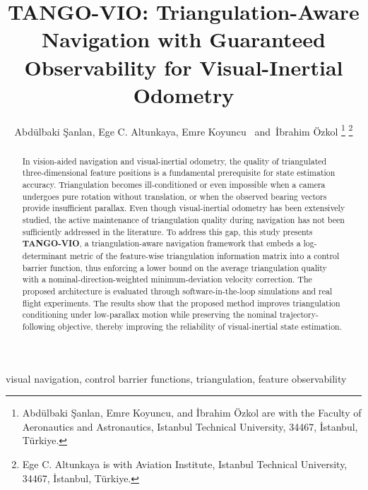 \documentclass[journal]{IEEEtran}
\begin{document}
\title{TANGO-VIO: Triangulation-Aware Navigation with Guaranteed Observability for Visual-Inertial Odometry}

\author{Abdülbaki Şanlan,
        Ege C. Altunkaya,
        Emre Koyuncu~ and~İbrahim Özkol 
\thanks{Abdülbaki Şanlan, Emre Koyuncu, and İbrahim Özkol are with the Faculty of Aeronautics and Astronautics, Istanbul Technical University, 34467, İstanbul, Türkiye.}
\thanks{Ege C. Altunkaya is with Aviation Institute, Istanbul Technical University, 34467, İstanbul, Türkiye.}}


\maketitle

\begin{abstract}
    In vision-aided navigation and visual-inertial odometry, the quality of
    triangulated three-dimensional feature positions is a fundamental prerequisite for state estimation accuracy. Triangulation becomes ill-conditioned or even impossible when a camera undergoes pure rotation without translation, or when the observed bearing vectors provide insufficient parallax. Even though visual-inertial odometry has been extensively studied, the active maintenance of triangulation quality during navigation has not been sufficiently addressed in the literature. To address this gap, this study presents \textbf{TANGO-VIO}, a triangulation-aware navigation framework that embeds a log-determinant metric of the feature-wise triangulation information matrix into a control barrier function, thus enforcing a lower bound on the average triangulation quality with a nominal-direction-weighted minimum-deviation velocity correction. The proposed architecture is evaluated through software-in-the-loop simulations and real flight experiments. The results show that the proposed method improves triangulation conditioning under low-parallax motion while preserving the nominal trajectory-following objective, thereby improving the reliability of visual-inertial state estimation.
\end{abstract}

\begin{IEEEkeywords}
    visual navigation, control barrier functions, triangulation, feature observability
\end{IEEEkeywords}
\end{document}
